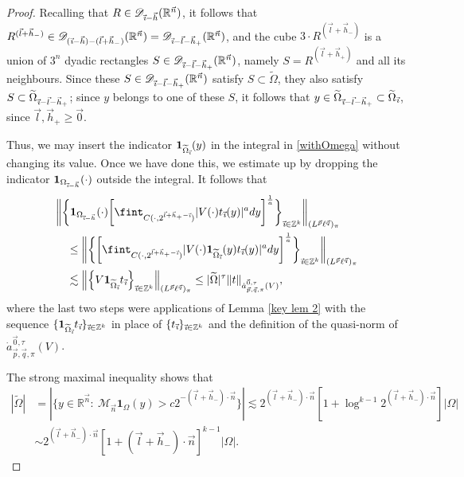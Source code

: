\documentclass[11pt, reqno]{amsart}
\theoremstyle{definition}
\theoremstyle{remark}
\numberwithin{equation}{section}
\newcommand{\D}{\mathscr D}
\newcommand{\R}{\mathbb R}
\newcommand{\Z}{\mathbb Z}
\newcommand{\vnull}{\vec 0}
\newcommand{\vh}{\vec h}
\newcommand{\vi}{\vec{\textit{\i}}}
\newcommand{\vn}{\vec n}
\newcommand{\vl}{\vec l}
\newcommand{\vp}{\vec p}
\newcommand{\vq}{\vec q}
\newcommand{\antau}{\dot a^{\vnull,\tau}_{\vp,\vq,\pi}}
\newcommand{\one}{\mathbf{1}}
\newcommand{\abs}[1]{|#1|}
\newcommand{\Norm}[2]{\|#1\|_{#2}}
\newcommand{\BNorm}[2]{\Big\|#1\Big\|_{#2}}
\newcommand{\bbNorm}[2]{\bigg\|#1\bigg\|_{#2}}
\begin{document}
\begin{proof}
Recalling that $R\in\D_{\vi-\vh}(\R^{\vn})$, it follows that $R^{(\vl+\vh_-)}\in \D_{(\vi-\vh)-(\vl+\vh_-)}(\R^{\vn})=\D_{\vi-\vl-\vh_+}(\R^{\vn})$, and the cube $3\cdot R^{(\vl+\vh_-)}$ is a union of $3^n$ dyadic rectangles $S\in\D_{\vi-\vl-\vh_+}(\R^{\vn})$, namely $S=R^{(\vl+\vh_+)}$ and all its neighbours. Since these $S\in\D_{\vi-\vl-\vh_+}(\R^{\vn})$ satisfy $S\subset\widetilde\Omega$, they also satisfy $S\subset\widetilde\Omega_{\vi-\vl-\vh_+}$; since $y$ belongs to one of these $S$,
it follows that $y\in\widetilde\Omega_{\vi-\vl-\vh_+}\subset\widetilde\Omega_{\vi}$, since $\vl,\vh_+\geq\vnull$.

Thus, we may insert the indicator $\one_{\widetilde\Omega_{\vi}}(y)$ in the integral in \eqref{withOmega} without changing its value. Once  we have done this, we estimate up by dropping the indicator $\one_{\Omega_{\vi-\vh}}(\cdot)$ outside the integral. It follows that
\begin{align*}
&\bbNorm{\bigg\{\one_{\Omega_{\vi-\vh}}(\cdot)\bigg[\fint_{C(\cdot,2^{\vl+\vh_+-\vi})}
\abs{V(\cdot)t_{\vi}(y)}^a dy\bigg]^{\frac1a}\bigg\}_{\vi\in\Z^k}}{
(L^{\vp}\ell^{\vq})_\pi} \\
&\quad\leq\bbNorm{\bigg\{\bigg[\fint_{C(\cdot,2^{\vl+\vh_+-\vi})}\abs{V(\cdot)
\one_{\widetilde\Omega_{\vi}}(y)t_{\vi}(y)}^a dy\bigg]^{\frac1a}\bigg\}_{\vi\in\Z^k}}{
(L^{\vp}\ell^{\vq})_\pi} \\
&\quad\lesssim\BNorm{\Big\{V\one_{\widetilde\Omega_{\vi}}t_{\vi}\Big\}_{\vi\in\Z^k}}
{(L^{\vp}\ell^{\vq})_\pi}
\leq\abs{\widetilde\Omega}^{\tau}\Norm{t}{\antau(V)},
\end{align*}
where the last two steps were applications of Lemma \ref{key lem 2} with the sequence $\{\one_{\widetilde\Omega_{\vi}}t_{\vi}\}_{\vi\in\Z^k}$ in place of $\{t_{\vi}\}_{\vi\in\Z^k}$ and the definition of the quasi-norm of $\antau(V)$.

The strong maximal inequality shows that
\begin{align*}
\abs{\widetilde\Omega}
&=|\{y\in\R^{\vn}:\
\mathcal M_{\vn}\one_{\Omega} (y)> c2^{-(\vl+\vh_-)\cdot\vn}\}|
\lesssim 2^{(\vl+\vh_-)\cdot\vn}[1+\log^{k-1}2^{(\vl+\vh_-)\cdot\vn}]\abs{\Omega} \\
&\sim 2^{(\vl+\vh_-)\cdot\vn}[1+(\vl+\vh_-)\cdot\vn]^{k-1}\abs{\Omega}.
\end{align*}


\end{proof}
\end{document}
